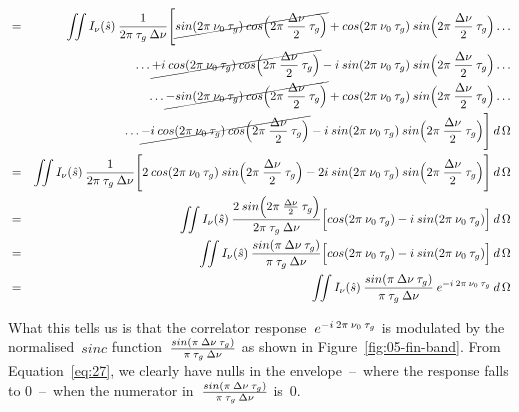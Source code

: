\documentclass[11pt, a4paper]{article}
\newcommand{\msp}{\mkern \medmuskip}
\begin{document}
\begin{eqnarray}
 \label{eq:27}
&=& \iint I_\nu (\hat{s}) \msp \frac{1}{2\pi \msp \tau _g \msp \Delta \nu} \Bigg [\cancel{sin (2\pi \msp \nu_ 0 \msp \tau _g) \msp cos\Big (2\pi \msp \frac{\Delta \nu }{2} \msp \tau _g\Big )} + cos(2\pi \msp \nu_ 0 \msp \tau _g) \msp sin\Big (2\pi \msp \frac{\Delta \nu }{2} \msp \tau _g\Big ) \dotso \nonumber \\
&& \dotso \cancel{+ i \msp cos (2\pi \msp \nu_ 0 \msp \tau _g) \msp cos\Big (2\pi \msp \frac{\Delta \nu }{2} \msp \tau _g\Big )} - i \msp sin(2\pi \msp \nu_ 0 \msp \tau _g) \msp sin\Big (2\pi \msp \frac{\Delta \nu }{2} \msp \tau _g\Big ) \dotso \nonumber \\
&& \dotso \cancel{- sin (2\pi \msp \nu_ 0 \msp \tau _g) \msp cos\Big (2\pi \msp \frac{\Delta \nu }{2} \msp \tau _g\Big )} + cos(2\pi \msp \nu_ 0 \msp \tau _g) \msp sin\Big (2\pi \msp \frac{\Delta \nu }{2} \msp \tau _g\Big ) \dotso \nonumber \\
&& \dotso \cancel{- i \msp cos (2\pi \msp \nu_ 0 \msp \tau _g) \msp cos\Big (2\pi \msp \frac{\Delta \nu }{2} \msp \tau _g\Big )} - i \msp sin(2\pi \msp \nu_ 0 \msp \tau _g) \msp sin\Big (2\pi \msp \frac{\Delta \nu }{2} \msp \tau _g\Big )\Bigg ] \msp d\,\Omega \nonumber \\
&=& \iint I_\nu (\hat{s}) \msp \frac{1}{2\pi \msp \tau _g \msp \Delta \nu} \Bigg [2 \msp cos(2\pi \msp \nu_ 0 \msp \tau _g) \msp sin\Big (2\pi \msp \frac{\Delta \nu }{2} \msp \tau _g\Big ) - 2 i \msp sin(2\pi \msp \nu_ 0 \msp \tau _g) \msp sin\Big (2\pi \msp \frac{\Delta \nu }{2} \msp \tau _g\Big ) \Bigg ] \msp d\,\Omega \nonumber \\
&=& \iint I_\nu (\hat{s}) \msp \frac{2 \msp sin\Big (2\pi \msp \frac{\Delta \nu }{2} \msp \tau _g\Big ) }{2\pi \msp \tau _g \msp \Delta \nu} \Big [cos(2\pi \msp \nu_ 0 \msp \tau _g) - i \msp sin(2\pi \msp \nu_ 0 \msp \tau _g) \Big ] \msp d\,\Omega \nonumber \\
&=& \iint I_\nu (\hat{s}) \msp \frac{sin (\pi \msp \Delta \nu \msp \tau _g)}{\pi \msp \tau _g \msp \Delta \nu} \Big [cos(2\pi \msp \nu_ 0 \msp \tau _g) - i \msp sin(2\pi \msp \nu_ 0 \msp \tau _g) \Big ] \msp d\,\Omega \nonumber \\
&=& \iint I_\nu (\hat{s}) \msp \frac{sin (\pi \msp \Delta \nu \msp \tau _g)}{\pi \msp \tau _g \msp \Delta \nu} \msp e^{-i \msp 2\pi \msp \nu _0 \msp \tau _g} \msp d\,\Omega
\end{eqnarray}

What this tells us is that the correlator response~$e^{-i \msp 2\pi \msp \nu _0 \msp \tau _g}$ is modulated by the normalised~$sinc$ function~$\frac{sin (\pi \msp \Delta \nu \msp \tau _g)}{\pi \msp \tau _g \msp \Delta \nu}$ as shown in Figure~\ref{fig:05-fin-band}. From Equation~\eqref{eq:27}, we clearly have nulls in the envelope~--~where the response falls to 0~--~when the numerator in~$\frac{sin (\pi \msp \Delta \nu \msp \tau _g)}{\pi \msp \tau _g \msp \Delta \nu}$ is~0.
\end{document}
